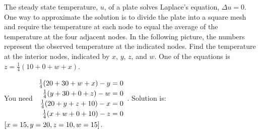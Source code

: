 \begin{ex}
  The steady state temperature, $u$, of a plate solves Laplace's
  equation, $\Delta u=0$. One way to approximate the solution is to
  divide the plate into a square mesh and require the temperature at
  each node to equal the average of the temperature at the four
  adjacent nodes. In the following picture, the numbers represent the
  observed temperature at the indicated nodes. Find the temperature at
  the interior nodes, indicated by $x$, $y$, $z$, and $w$. One of the
  equations is $z=\frac{1}{4}(10+0+w+x)$.

  \begin{center}
  \end{center}
  \begin{sol}
    You need $\def\arraystretch{1.2}
    \begin{array}{r}
      \frac{1}{4}(20+30+w+x) -y=0 \\
      \frac{1}{4}(y+30+0+z) -w=0 \\
      \frac{1}{4}(20+y+z+10) -x=0 \\
      \frac{1}{4}(x+w+0+10) -z=0
    \end{array}$.
    Solution is: $\left[x=15,y=20,z=10,w=15\right]$.
  \end{sol}
\end{ex}

